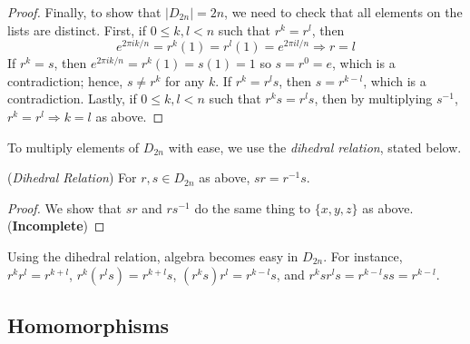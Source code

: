 \documentclass[10pt, a4paper, twoside]{report}
\begin{document}
\begin{proof}
    Finally, to show that \(|D_{2n}|=2n\), we need to check that all elements on the lists are distinct. First, if \(0\leq k,l< n\) such that \(r^k=r^l\), then 
    \[e^{2\pi ik/n}=r^k(1)=r^l(1)=e^{2\pi il/n}\Rightarrow r=l\]
    If \(r^k=s\), then \(e^{2\pi ik/n}=r^k(1)=s(1)=1\) so \(s=r^0=e\), which is a contradiction; hence, \(s\neq r^k\) for any \(k\). If \(r^k=r^ls\), then \(s=r^{k-l}\), which is a contradiction. Lastly, if \(0\leq k,l<n\) such that \(r^ks=r^ls\), then by multiplying \(s^{-1}\), \(r^k=r^l\Rightarrow k=l\) as above.
\end{proof}
To multiply elements of \(D_{2n}\) with ease, we use the \emph{dihedral relation}, stated below.
\begin{lemma}
    (\emph{Dihedral Relation}) For \(r,s\in D_{2n}\) as above, \(sr=r^{-1}s\).
\end{lemma}
\begin{proof}
    We show that \(sr\) and \(rs^{-1}\) do the same thing to \(\{x,y,z\}\) as above. (\textbf{Incomplete})
\end{proof}
Using the dihedral relation, algebra becomes easy in \(D_{2n}\). For instance, \(r^kr^l=r^{k+l}\), \(r^k(r^ls)=r^{k+l}s\), \((r^ks)r^l=r^{k-l}s\), and \(r^ksr^ls=r^{k-l}ss=r^{k-l}\).
\subsection{Homomorphisms}
\end{document}
